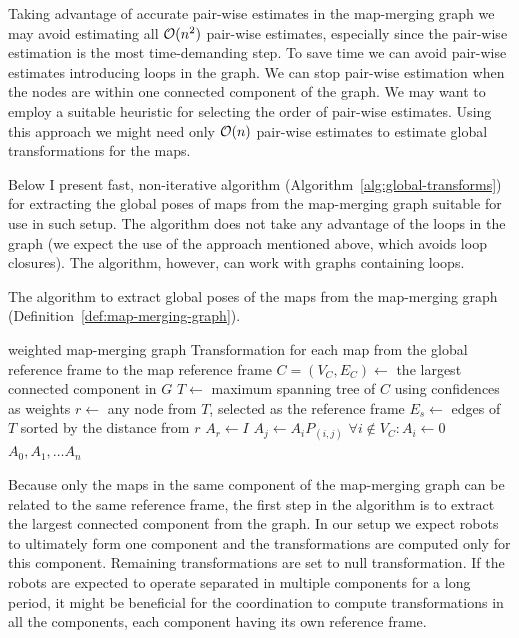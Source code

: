 Taking advantage of accurate pair-wise estimates in the map-merging graph we may avoid estimating all $\operatorname{\mathcal{O}}(n^2)$ pair-wise estimates, especially since the pair-wise estimation is the most time-demanding step. To save time we can avoid pair-wise estimates introducing loops in the graph. We can stop pair-wise estimation when the nodes are within one connected component of the graph. We may want to employ a suitable heuristic for selecting the order of pair-wise estimates. Using this approach we might need only $\operatorname{\mathcal{O}}(n)$ pair-wise estimates to estimate global transformations for the maps.

Below I present fast, non-iterative algorithm (Algorithm~\ref{alg:global-transforms}) for extracting the global poses of maps from the map-merging graph suitable for use in such setup. The algorithm does not take any advantage of the loops in the graph (we expect the use of the approach mentioned above, which avoids loop closures). The algorithm, however, can work with graphs containing loops.

\begin{algorithm}
    \caption[Global poses extraction]{The algorithm to extract global poses of the maps from the map-merging graph (Definition~\ref{def:map-merging-graph}).}
    \label{alg:global-transforms}
    \begin{algorithmic}[1]
        \Require weighted map-merging graph
        \Ensure Transformation for each map from the global reference frame to the map reference frame
            \State $C = (V_C, E_C) \gets$ the largest connected component in $G$
            \State $T \gets$ maximum spanning tree of $C$ using confidences as weights
            \State $r \gets$ any node from $T$, selected as the reference frame
            \State $E_s \gets$ edges of $T$ sorted by the distance from $r$
            \State $A_r \gets I$
                \State $A_j \gets A_i P_{(i,j)}$
            \EndFor
            \State $\forall i \not\in V_C: A_i \gets 0$
            \State \Return $A_0, A_1, \dots A_n$
        \EndFunction
    \end{algorithmic}
\end{algorithm}

Because only the maps in the same component of the map-merging graph can be related to the same reference frame, the first step in the algorithm is to extract the largest connected component from the graph. In our setup we expect robots to ultimately form one component and the transformations are computed only for this component. Remaining transformations are set to null transformation. If the robots are expected to operate separated in multiple components for a long period, it might be beneficial for the coordination to compute transformations in all the components, each component having its own reference frame.

